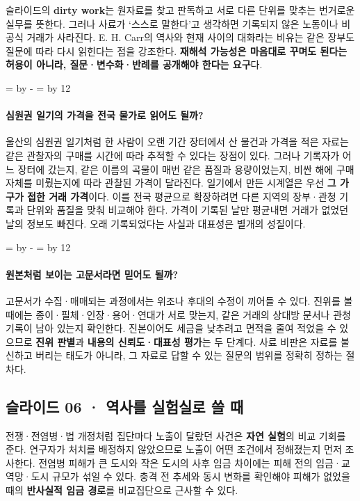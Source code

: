 \documentclass[10pt,a4paper]{article}
\newcommand{\ReserveQuestionSpace}{%
  \par\begingroup
  \dimen0=\pagegoal \advance\dimen0 by -\pagetotal
  \dimen2=\baselineskip \multiply\dimen2 by 12
  \ifdim\dimen0<\dimen2 \newpage\fi
  \endgroup}
\begin{document}
슬라이드의 \textbf{dirty work}는 원자료를 찾고 판독하고 서로 다른 단위를 맞추는 번거로운 실무를 뜻한다. 그러나 사료가 ‘스스로 말한다’고 생각하면 기록되지 않은 노동이나 비공식 거래가 사라진다. E. H. Carr의 역사와 현재 사이의 대화라는 비유는 같은 장부도 질문에 따라 다시 읽힌다는 점을 강조한다. \textbf{재해석 가능성은 마음대로 꾸며도 된다는 허용이 아니라, 질문·변수화·반례를 공개해야 한다는 요구}다.\par

\ReserveQuestionSpace
\paragraph{심원권 일기의 가격을 전국 물가로 읽어도 될까?}

울산의 심원권 일기처럼 한 사람이 오랜 기간 장터에서 산 물건과 가격을 적은 자료는 같은 관찰자의 구매를 시간에 따라 추적할 수 있다는 장점이 있다. 그러나 기록자가 어느 장터에 갔는지, 같은 이름의 곡물이 매번 같은 품질과 용량이었는지, 비싼 해에 구매 자체를 미뤘는지에 따라 관찰된 가격이 달라진다. 일기에서 만든 시계열은 우선 \textbf{그 가구가 접한 거래 가격}이다. 이를 전국 평균으로 확장하려면 다른 지역의 장부·관청 기록과 단위와 품질을 맞춰 비교해야 한다. 가격이 기록된 날만 평균내면 거래가 없었던 날의 정보도 빠진다. 오래 기록되었다는 사실과 대표성은 별개의 성질이다.\par

\ReserveQuestionSpace
\paragraph{원본처럼 보이는 고문서라면 믿어도 될까?}

고문서가 수집·매매되는 과정에서는 위조나 후대의 수정이 끼어들 수 있다. 진위를 볼 때에는 종이·필체·인장·용어·연대가 서로 맞는지, 같은 거래의 상대방 문서나 관청 기록이 남아 있는지 확인한다. 진본이어도 세금을 낮추려고 면적을 줄여 적었을 수 있으므로 \textbf{진위 판별}과 \textbf{내용의 신뢰도·대표성 평가}는 두 단계다. 사료 비판은 자료를 불신하고 버리는 태도가 아니라, 그 자료로 답할 수 있는 질문의 범위를 정확히 정하는 절차다.\par

\subsection{슬라이드 06 · 역사를 실험실로 쓸 때}
전쟁·전염병·법 개정처럼 집단마다 노출이 달랐던 사건은 \textbf{자연 실험}의 비교 기회를 준다. 연구자가 처치를 배정하지 않았으므로 노출이 어떤 조건에서 정해졌는지 먼저 조사한다. 전염병 피해가 큰 도시와 작은 도시의 사후 임금 차이에는 피해 전의 임금·교역망·도시 규모가 섞일 수 있다. 충격 전 추세와 동시 변화를 확인해야 피해가 없었을 때의 \textbf{반사실적 임금 경로}를 비교집단으로 근사할 수 있다.\par
\end{document}
